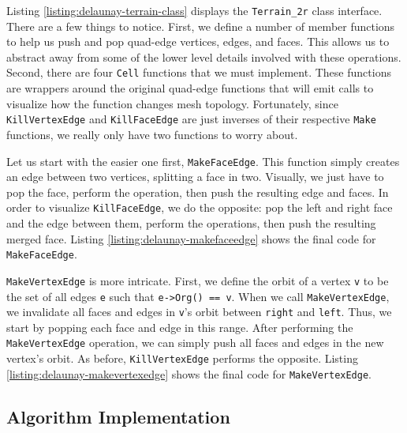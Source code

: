 Listing \ref{listing:delaunay-terrain-class} displays the \texttt{Terrain\_2r}
class interface. There are a few things to notice. First, we define a number of
member functions to help us push and pop quad-edge vertices, edges, and faces.
This allows us to abstract away from some of the lower level details involved
with these operations. Second, there are four \texttt{Cell} functions that we
must implement. These functions are wrappers around the original quad-edge
functions that will emit calls to visualize how the function changes mesh
topology. Fortunately, since \texttt{KillVertexEdge} and \texttt{KillFaceEdge}
are just inverses of their respective \texttt{Make} functions, we really only
have two functions to worry about.



Let us start with the easier one first, \texttt{MakeFaceEdge}. This function
simply creates an edge between two vertices, splitting a face in two. Visually,
we just have to pop the face, perform the operation, then push the resulting
edge and faces. In order to visualize \texttt{KillFaceEdge}, we do the opposite:
pop the left and right face and the edge between them, perform the operations,
then push the resulting merged face. Listing \ref{listing:delaunay-makefaceedge}
shows the final code for \texttt{MakeFaceEdge}.



\texttt{MakeVertexEdge} is more intricate. First, we define the orbit of a
vertex \texttt{v} to be the set of all edges \texttt{e} such that
\texttt{e->Org() == v}. When we call \texttt{MakeVertexEdge}, we invalidate all
faces and edges in \texttt{v}'s orbit between \texttt{right} and \texttt{left}.
Thus, we start by popping each face and edge in this range. After performing the
\texttt{MakeVertexEdge} operation, we can simply push all faces and edges in the
new vertex's orbit. As before, \texttt{KillVertexEdge} performs the opposite.
Listing \ref{listing:delaunay-makevertexedge} shows the final code for
\texttt{MakeVertexEdge}.



\FloatBarrier
\subsection{Algorithm Implementation}


